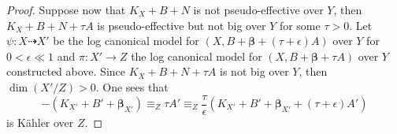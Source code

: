 \documentclass[11pt]{amsart}
\numberwithin{equation}{section}
\def\bbeta{\boldsymbol{\beta}}
\def\dim{\operatorname{dim}}
\theoremstyle{definition}
\theoremstyle{definition}
\newtheorem{proposition}[theorem]{Proposition}
\theoremstyle{definition}
\begin{document}
\begin{proof}
Suppose now that $K_X+B+N$ is not pseudo-effective over $Y$, then $K_X+B+N+\tau A$ is pseudo-effective but not big over $Y$ for some $\tau >0$. %
Let $\psi :X\dasharrow X'$ be the log canonical model for $(X,B+\bbeta+(\tau +\epsilon) A)$ over $Y$ for $0<\epsilon \ll 1$ and $\pi:X'\to Z$ the log canonical model for $(X,B+\bbeta+\tau A)$ over $Y$ constructed above. Since $K_X+B+N+\tau A$ is not big over $Y$, then $\dim (X'/Z)>0$. One sees that \[-(K_{X'}+B'+\bbeta _{X'})\equiv _Z \tau A'\equiv _Z\frac \tau \epsilon (K_{X'}+B'+\bbeta _{X'}+(\tau +\epsilon) A')\] is K\"ahler over $Z$.
\end{proof}
\end{document}
